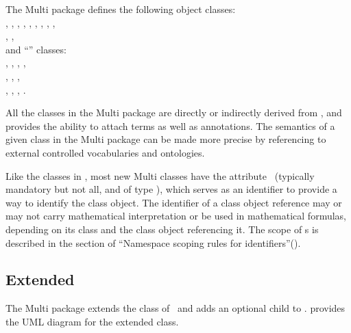 \mBlockChangedBegin{\revTwentyTwentyMarch}The Multi package defines the following object classes: \mBlockChangedEnd{\revTwentyTwentyMarch}\\
\CompartmentReference, \SpeciesType, \SpeciesFeatureType, \PossibleSpeciesFeatureValue, \SpeciesTypeInstance, 
\InSpeciesTypeBond, \SpeciesTypeComponentIndex, \SubListOfSpeciesFeatures, \OutwardBindingSite,\\
\SpeciesFeature, \SpeciesFeatureValue, \SpeciesTypeComponentMapInProduct\\
\mBlockChangedBegin{\revTwentyTwentyMarch}and ``'' classes:\mBlockChangedEnd{\revTwentyTwentyMarch} \\
\ListOfSpeciesTypes,  \ListOfCompartmentReferences, \ListOfSpeciesTypeInstances, \ListOfSpeciesFeatureTypes,\\
\ListOfInSpeciesTypeBonds, \ListOfSpeciesTypeComponentIndexes, \ListOfPossibleSpeciesFeatureValues,\\
\ListOfOutwardBindingSites, \ListOfSpeciesFeatures, \ListOfSpeciesFeatureValues, \ListOfSpeciesTypeComponentMapsInProduct.  


All the classes in the Multi package are directly or indirectly derived from \SBase, and \SBase provides the ability to attach  terms as well as  annotations. The semantics of a given class in the Multi package can be made more precise by referencing to external controlled vocabularies and ontologies.

Like the classes in \SbmlLevelThreeCore, most new Multi classes have the attribute \idAtt\ (typically mandatory but not all, and of type \SIdPT), which serves as an identifier to provide a way to identify the class object. The identifier of a class object reference may or may not carry  mathematical interpretation or be used in mathematical formulas, depending on its class and the class object referencing it. The scope of \idAtt s is described in the section of ``Namespace scoping rules for identifiers''(). 

\mBlockChangedBegin{\revTwentyTwentyMarch}
\subsection{Extended }\mBlockChangedEnd{\revTwentyTwentyMarch}
\label{def:Model}

The Multi package extends the \Model class of \SbmlLevelThreeCore\ and adds an optional \ListOfSpeciesTypes child to \ExModel.  provides the UML diagram for the extended \ExModel class.

